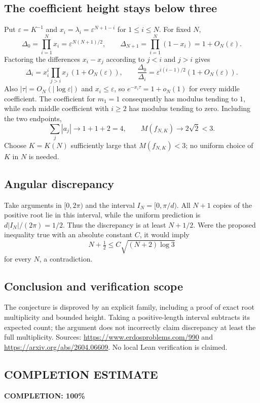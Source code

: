 \subsection*{The coefficient height stays below three}
Put $\varepsilon=K^{-1}$ and $x_i=\lambda_i=\varepsilon^{N+1-i}$ for $1\le i\le N$.
For fixed $N$,
\[
 \Delta_0=\prod_{i=1}^{N}x_i=\varepsilon^{N(N+1)/2},
 \qquad \Delta_{N+1}=\prod_{i=1}^{N}(1-x_i)=1+O_N(\varepsilon).
\]
Factoring the differences $x_i-x_j$ according to $j<i$ and $j>i$ gives
\[
 \Delta_i=x_i^i\prod_{j>i}x_j\,(1+O_N(\varepsilon)),\qquad
 \frac{\Delta_0}{\Delta_i}
 =\varepsilon^{i(i-1)/2}(1+O_N(\varepsilon)).
\]
Also $|\tau|=O_N(|\log\varepsilon|)$ and $x_i\le\varepsilon$, so
$e^{-x_i\tau}=1+o_N(1)$ for every middle coefficient.
The coefficient for $m_1=1$ consequently has modulus tending to $1$, while each middle coefficient with $i\ge2$ has modulus tending to zero. Including the two endpoints,
\[
 \sum_j|a_j|\longrightarrow 1+1+2=4,\qquad
 M(f_{N,K})\longrightarrow 2\sqrt2<3.
\]
Choose $K=K(N)$ sufficiently large that $M(f_{N,K})<3$; no uniform choice of $K$ in $N$ is needed.

\subsection*{Angular discrepancy}
Take arguments in $[0,2\pi)$ and the interval $I_N=[0,\pi/d)$.
All $N+1$ copies of the positive root lie in this interval, while the uniform prediction is $d|I_N|/(2\pi)=1/2$. Thus the discrepancy is at least $N+1/2$. Were the proposed inequality true with an absolute constant $C$, it would imply
\[
 N+\tfrac12\le C\sqrt{(N+2)\log3}
\]
for every $N$, a contradiction.

\subsection*{Conclusion and verification scope}
The conjecture is disproved by an explicit family, including a proof of exact root multiplicity and bounded height. Taking a positive-length interval subtracts its expected count; the argument does not incorrectly claim discrepancy at least the full multiplicity. Sources: \url{https://www.erdosproblems.com/990} and \url{https://arxiv.org/abs/2604.06609}. No local Lean verification is claimed.
\subsection*{COMPLETION ESTIMATE}
\textbf{COMPLETION: 100\%}
